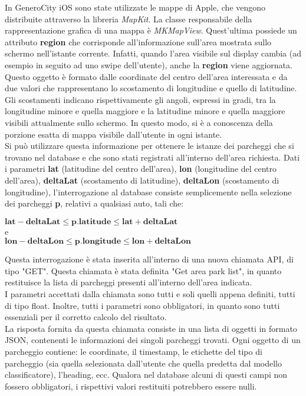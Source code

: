 In GeneroCity iOS sono state utilizzate le mappe di Apple, che vengono distribuite
attraverso la libreria \emph{MapKit}. La classe responsabile della rappresentazione
grafica di una mappa è \emph{MKMapView}. Quest'ultima possiede un attributo \textbf{region}
che corrisponde all'informazione sull'area mostrata sullo schermo nell'istante corrente.
Infatti, quando l'area visibile sul display cambia (ad esempio in seguito ad uno swipe
dell'utente), anche la \textbf{region} viene aggiornata. Questo oggetto è formato dalle
coordinate del centro dell'area interessata e da due valori che rappresentano lo 
scostamento di longitudine e quello di latitudine. Gli scostamenti indicano rispettivamente gli
angoli, espressi in gradi, tra la longitudine minore e quella maggiore e la latitudine 
minore e quella maggiore visibili attualmente sullo schermo. In questo modo, si è a conoscenza della porzione esatta di mappa visibile dall'utente
in ogni istante.\\
Si può utilizzare questa informazione per ottenere le istanze dei parcheggi che si trovano 
nel database e che sono stati registrati all'interno dell'area richiesta.
Dati i parametri \textbf{lat} (latitudine del centro dell'area), \textbf{lon} 
(longitudine del centro dell'area), \textbf{deltaLat} (scostamento di latitudine), 
\textbf{deltaLon} (scostamento di longitudine), l'interrogazione
al database consiste semplicemente nella selezione dei parcheggi \textbf{p}, relativi
a qualsiasi auto, tali che:
\begin{center}
    $ \textbf{lat} - \textbf{deltaLat} \le \textbf{p.latitude} \le \textbf{lat} + \textbf{deltaLat}$\\
    e\\
    $ \textbf{lon} - \textbf{deltaLon} \le \textbf{p.longitude} \le \textbf{lon} + \textbf{deltaLon}$
\end{center}
Questa interrogazione è stata inserita all'interno di una nuova chiamata API, di tipo "GET".
Questa chiamata è stata definita "Get area park list", in quanto restituisce la lista di 
parcheggi presenti all'interno dell'area indicata.\\
I parametri accettati dalla chiamata sono tutti e soli quelli appena definiti,
tutti di tipo float. Inoltre, tutti i parametri sono obbligatori, in quanto 
sono tutti essenziali per il corretto calcolo del risultato.\\
La risposta fornita da questa chiamata consiste in una lista di oggetti in formato JSON, 
contenenti le informazioni dei singoli parcheggi trovati. Ogni oggetto di un parcheggio
contiene: le coordinate, il timestamp, le etichette del tipo di parcheggio (sia quella 
selezionata dall'utente che quella predetta dal modello classificatore), l'heading, ecc.
Qualora nel database alcuni di questi campi non fossero obbligatori, i rispettivi valori 
restituiti potrebbero essere nulli.



